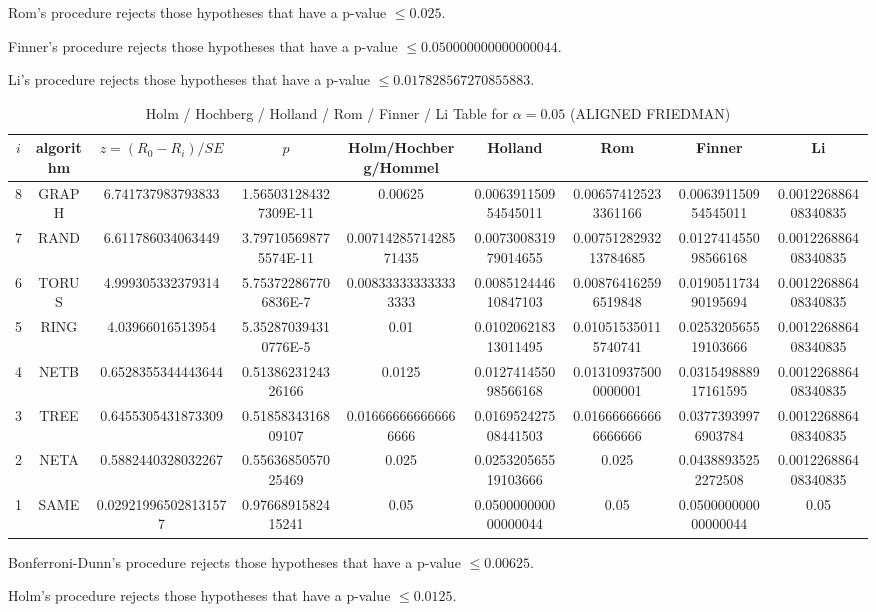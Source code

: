 \documentclass[a4paper,10pt]{article}
\begin{document}
\begin{landscape}
Rom's procedure rejects those hypotheses that have a p-value $\le0.025$.


Finner's procedure rejects those hypotheses that have a p-value $\le0.050000000000000044$.


Li's procedure rejects those hypotheses that have a p-value $\le0.017828567270855883$.



\newpage

\begin{table}[!htp]
\centering\scriptsize
\caption{Holm / Hochberg / Holland / Rom / Finner / Li Table for $\alpha=0.05$ (ALIGNED FRIEDMAN)}
\begin{tabular}{ccccccccc}
$i$&algorithm&$z=(R_0 - R_i)/SE$&$p$&Holm/Hochberg/Hommel&Holland&Rom&Finner&Li\\
\hline
8& GRAPH&6.741737983793833&1.565031284327309E-11&0.00625&0.006391150954545011&0.006574125233361166&0.006391150954545011&0.001226886408340835\\
7& RAND&6.611786034063449&3.797105698775574E-11&0.0071428571428571435&0.007300831979014655&0.0075128293213784685&0.012741455098566168&0.001226886408340835\\
6& TORUS&4.999305332379314&5.753722867706836E-7&0.008333333333333333&0.008512444610847103&0.008764162596519848&0.019051173490195694&0.001226886408340835\\
5& RING&4.03966016513954&5.352870394310776E-5&0.01&0.010206218313011495&0.010515350115740741&0.025320565519103666&0.001226886408340835\\
4& NETB&0.6528355344443644&0.5138623124326166&0.0125&0.012741455098566168&0.013109375000000001&0.031549888917161595&0.001226886408340835\\
3& TREE&0.6455305431873309&0.5185834316809107&0.016666666666666666&0.016952427508441503&0.016666666666666666&0.03773939976903784&0.001226886408340835\\
2& NETA&0.5882440328032267&0.5563685057025469&0.025&0.025320565519103666&0.025&0.04388935252272508&0.001226886408340835\\
1& SAME&0.029219965028131577&0.9766891582415241&0.05&0.050000000000000044&0.05&0.050000000000000044&0.05\\
\hline
\end{tabular}
\end{table}
Bonferroni-Dunn's procedure rejects those hypotheses that have a p-value $\le0.00625$.


Holm's procedure rejects those hypotheses that have a p-value $\le0.0125$.



\end{landscape}
\end{document}
